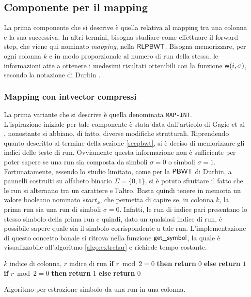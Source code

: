 \subsection{Componente per il mapping}
La prima componente che si descrive è quella relativa
al mapping tra una colonna e la sua successiva. In altri termini, bisogna
studiare come effettuare il forward-step, che viene qui nominato
\textit{mapping}, nella $\mbox{\rm {\sf RLPBWT}}$. Bisogna memorizzare, 
per 
ogni colonna $k$ e in modo proporzionale al numero di run della stessa, le
informazioni atte a ottenere i medesimi risultati ottenibili con la funzione
$\mbox{\rm {\sf w}}(i,\sigma)$, secondo la notazione di Durbin \cite{pbwt}. 
\subsubsection{Mapping con intvector compressi}
La prima variante che si descrive è quella denominata \texttt{MAP-INT}.\\
L'ispirazione iniziale per tale componente è stata data dall'articolo di Gagie
et al \cite{tricks}, nonostante si abbiano, di fatto, diverse modifiche
strutturali. Riprendendo quanto descritto al termine della sezione
\ref{secpbwt}, si è deciso di
memorizzare gli indici delle teste di run. Ovviamente questa informazione non è
sufficiente per poter sapere 
se una run sia composta da simboli $\sigma=0$ o simboli
$\sigma=1$. Fortunatamente, essendo lo studio limitato, come per la
$\mbox{\rm {\sf PBWT}}$ di Durbin, a pannelli costruiti su alfabeto binario $\Sigma=\{0,1\}$, si
è 
potuto sfruttare il fatto che le run si alternano tra un carattere e
l'altro. Basta quindi tenere in memoria un valore booleano nominato
$start_k$, che permetta di 
capire se, in colonna $k$, la prima run sia una run di simboli
$\sigma=0$. Infatti, le run di 
indice pari presentano lo stesso simbolo della prima run e quindi, dato un
qualsiasi indice di run, è possibile sapere quale sia il simbolo corrispondente
a tale run. L'implementazione di questo concetto banale si ritrova nella
funzione $\mbox{\rm {\sf get\_symbol}}$, la quale è
visualizzabile all'algoritmo \ref{algo:extrchar} e richiede tempo costante.
\begin{algorithm}
  \footnotesize
  \begin{algorithmic}[1]
    \Comment $k$ indice di colonna, $r$ indice di run
    \State \textbf{if} $r\bmod 2 = 0$ \textbf{then} \textbf{return} $0$
    \textbf{else} \textbf{return} $1$
    \Else
    \State \textbf{if} $r\bmod 2 = 0$ \textbf{then} \textbf{return} $1$
    \textbf{else} \textbf{return} $0$
    \EndIf
    \EndFunction
  \end{algorithmic}
  \caption{Algoritmo per estrazione simbolo da una run in una colonna.}
  \label{algo:extrchar}
\end{algorithm}

